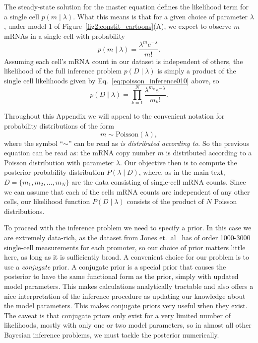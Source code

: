 The steady-state solution for the master equation defines the likelihood term
for a single cell $p(m \mid \lambda)$. What this means is that for a given
choice of parameter $\lambda$, under model 1 of
Figure~\ref{fig2:constit_cartoons}(A), we expect to observe $m$ mRNAs in a
single cell with probability
\begin{equation}
p(m\mid\lambda) = \frac{\lambda^m e^{-\lambda}}{m!}.
\label{eq:poisson_inference010}
\end{equation}
Assuming each cell's mRNA count in our dataset is independent of others, the
likelihood of the full inference problem $p(D\mid\lambda)$ is simply a product
of the single cell likelihoods given by Eq.~\ref{eq:poisson_inference010} above, so
\begin{equation}
p(D\mid\lambda) = \prod_{k=1}^N \frac{\lambda^{m_k}e^{-\lambda}}{m_k!}.
\end{equation}

Throughout this Appendix we will appeal to the convenient notation for
probability distributions of the form
\begin{equation}
m \sim \text{Poisson}(\lambda),
\end{equation}
where the symbol ``$\sim$'' can be read as \textit{is distributed according to}.
So the previous equation can be read as: the mRNA copy number $m$ is distributed
according to a Poisson distribution with parameter $\lambda$. Our objective then
is to compute the posterior probability distribution $P(\lambda \mid D)$, where,
as in the main text, $D = \{ m_1, m_2, \ldots, m_N \}$ are the data consisting
of single-cell mRNA counts. Since we can assume that each of the cells mRNA
counts are independent of any other cells, our likelihood function $P(D \mid
\lambda)$ consists of the product of $N$ Poisson distributions.

To proceed with the inference problem we need to specify a prior. In this case
we are extremely data-rich, as the dataset from Jones et.\ al~\cite{Jones2014}
has of order 1000-3000 single-cell measurements for each promoter, so our choice
of prior matters little here, as long as it is sufficiently broad. A convenient
choice for our problem is to use a \textit{conjugate} prior. A conjugate prior
is a special prior that causes the posterior to have the same functional form as
the prior, simply with updated model parameters. This makes calculations
analytically tractable and also offers a nice interpretation of the inference
procedure as updating our knowledge about the model parameters. This makes
conjugate priors very useful when they exist. The caveat is that conjugate
priors only exist for a very limited number of likelihoods, mostly with only one
or two model parameters, so in almost all other Bayesian inference problems, we
must tackle the posterior numerically.

